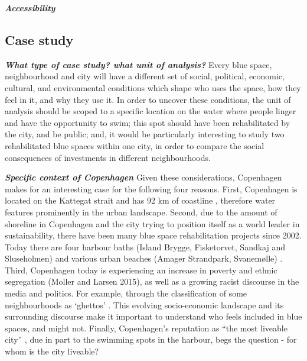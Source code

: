 \documentclass{article}
\newcommand{\bisection}[1]{\textbf{\textit{#1}}}
\begin{document}

\bisection{Accessibility}

\subsection{Case study}

\bisection{What type of case study? what unit of analysis?}
Every blue space, neighbourhood and city will have a different set of social, political, economic, cultural, and environmental conditions which shape who uses the space, how they feel in it, and why they use it. 
In order to uncover these conditions, the unit of analysis should be scoped to a specific location on the water where people linger and have the opportunity to swim; this spot should have been rehabilitated by the city, and be public; and, it would be particularly interesting to study two rehabilitated blue spaces within one city, in order to compare the social consequences of investments in different neighbourhoods.

\bisection{Specific context of Copenhagen}
Given these considerations, Copenhagen makes for an interesting case for the following four reasons. First, Copenhagen is located on the Kattegat strait and has 92 km of coastline \parencite{comertler2017greens}, therefore water features prominently in the urban landscape. Second, due to the amount of shoreline in Copenhagen and the city trying to position itself as a world leader in sustainability, there have been many blue space rehabilitation projects since 2002. Today there are four harbour baths (Island Brygge, Fisketorvet, Sandkaj and Sluseholmen) and various urban beaches (Amager Strandpark, Svanemølle) \parencite{visitcopenhagen_baths}. Third, Copenhagen today is experiencing an increase in poverty and ethnic segregation (Moller and Larsen 2015), as well as a growing racist discourse in the media and politics. For example, through the classification of some neighbourhoods as ‘ghettos’  \parencite{simonsen2008practice}. This evolving socio-economic landscape and its surrounding discourse make it important to understand who feels included in blue spaces, and might not. Finally, Copenhagen’s reputation as “the most liveable city” \parencite{visitdenmark_2021}, due in part to the swimming spots in the harbour, begs the question - for whom is the city liveable?
\end{document}

